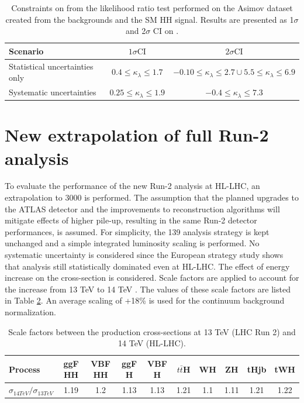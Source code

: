 \begin{table}[htbp]
    \centering
    \begin{tabular}{lcc}
\hline \hline Scenario & $1 \sigma \mathrm{CI}$ & $2 \sigma \mathrm{CI}$ \\
\hline Statistical uncertainties only & $0.4 \leq \kappa_{\lambda} \leq 1.7$ & $-0.10 \leq \kappa_{\lambda} \leq 2.7 \cup 5.5 \leq \kappa_{\lambda} \leq 6.9$ \\
Systematic uncertainties & $0.25 \leq \kappa_{\lambda} \leq 1.9$ & $-0.4 \leq \kappa_{\lambda} \leq 7.3$ \\
\hline \hline
\end{tabular}
    \caption{Constraints on \kl from the likelihood ratio test performed on the Asimov dataset created from the backgrounds and the SM HH signal. Results are presented as 1$\sigma$ and 2$\sigma$ CI on \kl.}
    \label{tab:HL-LHC:Comb:CI}
\end{table}


\section{New extrapolation of full Run-2 \HHyybb analysis}

To evaluate the performance of the new Run-2 \HHyybb analysis at HL-LHC, an extrapolation to 3000 \ifb is performed. The assumption that the planned upgrades to the ATLAS detector and the improvements to reconstruction algorithms will mitigate effects of higher pile-up, resulting in the same Run-2 detector performances, is assumed. For simplicity, the 139 \ifb analysis strategy is kept unchanged and a simple integrated luminosity scaling is performed. No systematic uncertainty is considered since the European strategy study shows that \bbyy analysis still statistically dominated even at HL-LHC. The effect of energy increase on the cross-section is considered. Scale factors are applied to account for the increase from 13 TeV to 14 TeV \cite{CERN_yellow}. The values of these scale factors are listed in Table \ref{tab:HL-LHC:XSec}. An average scaling of +18\% is used for the continuum background normalization.

\begin{table}[htbp]
    \centering
    \begin{tabular}{lccccccccc}
    \hline\hline
    Process & ggF HH & VBF HH & ggF H & VBF H & $t\bar{t}$H & WH & ZH & tHjb & tWH \\
    \hline
    $\sigma_{14TeV}/\sigma_{13TeV}$ & 1.19 & 1.2 & 1.13 & 1.13 & 1.21 & 1.1 & 1.11 & 1.21 & 1.22 \\
    \hline\hline
    \end{tabular}
    \caption{Scale factors between the production cross-sections at 13 TeV (LHC Run 2) and 14 TeV (HL-LHC). }
    \label{tab:HL-LHC:XSec}
\end{table}

